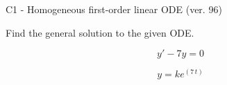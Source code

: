 \begin{exercise}
  \begin{exerciseTitle}C1 - Homogeneous first-order linear ODE (ver. 96)\end{exerciseTitle}
  \begin{exerciseStatement}
    
Find the general solution to the given ODE.

    
\[y'-7y=0\]

  \end{exerciseStatement}
  \begin{exerciseAnswer}
    
\[y= k e^{\left(7 \, t\right)}\]

  \end{exerciseAnswer}
\end{exercise}